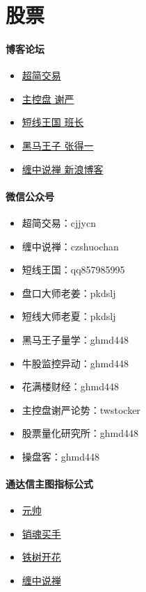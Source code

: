 
\section{股票}
\paragraph{博客论坛}
\begin{itemize}
	\item \href{https://www.vzan.com/f/s-688}{超简交易}
	\item \href{http://zjt.aniu.tv/experts_index_eid_1001379.shtml}{主控盘 谢严}
	\item \href{http://blog.sina.com.cn/s/articlelist_1514551012_0_1.html}{短线王国 班长}
	\item \href{http://blog.sina.com.cn/s/articlelist_1573407745_0_1.html}{黑马王子 张得一}
	\item \href{http://blog.sina.com.cn/s/articlelist_1215172700_10_1.html}{缠中说禅 新浪博客}
\end{itemize}
\paragraph{微信公众号}
\begin{itemize}
	\item 超简交易：cjjycn
	\item 缠中说禅：czshuochan
	\item 短线王国：qq857985995
	\item 盘口大师老姜：pkdslj
	\item 短线大师老夏：pkdslj
	\item 黑马王子量学：ghmd448
	\item 牛股监控异动：ghmd448
	\item 花满楼财经：ghmd448
	\item 主控盘谢严论势：twstocker
	\item 股票量化研究所：ghmd448
	\item 操盘客：ghmd448
\end{itemize}
\paragraph{通达信主图指标公式}
\begin{itemize}
	\item \href{http://www.gupang.com/201603/03243Z432016.html}{元帅}
	\item \href{http://www.gupang.com/201610/101040O42016.html}{销魂买手}
	\item \href{http://www.gupang.com/201512/12043Q4H015.html}{铁树开花}
	\item \href{http://www.gupang.com/201303/0326291H2013.html}{缠中说禅}
\end{itemize}